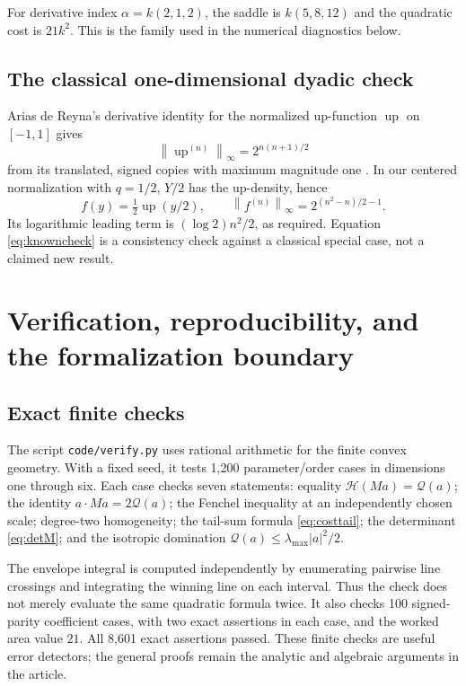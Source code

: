 \documentclass[11pt,a4paper]{article}
\numberwithin{equation}{section}
\theoremstyle{definition}
\theoremstyle{remark}\newtheorem{remark}[theorem]{Remark}
\newcommand{\He}{\mathcal H}
\newcommand{\Qf}{\mathcal Q}
\newcommand{\norm}[1]{\left\lVert #1\right\rVert}
\begin{document}
For derivative index $\alpha=k(2,1,2)$, the saddle is
$k(5,8,12)$ and the quadratic cost is $21k^2$. This is the family used in
the numerical diagnostics below.

\subsection{The classical one-dimensional dyadic check}

Arias de Reyna's derivative identity for the normalized up-function
$\operatorname{up}$ on $[-1,1]$ gives
\begin{equation}
 \norm{\operatorname{up}^{(n)}}_\infty=2^{n(n+1)/2}
 \label{eq:upnorm}
\end{equation}
from its translated, signed copies with maximum magnitude one
\cite[Theorem 4]{Arias}. In our centered normalization with $q=1/2$,
$Y/2$ has the up-density, hence
\begin{equation}
 f(y)=\tfrac12\operatorname{up}(y/2),\qquad
 \norm{f^{(n)}}_\infty=2^{(n^2-n)/2-1}.
 \label{eq:knowncheck}
\end{equation}
Its logarithmic leading term is $(\log2)n^2/2$, as required.
Equation \eqref{eq:knowncheck} is a consistency check against a classical
special case, not a claimed new result.

\section{Verification, reproducibility, and the formalization boundary}
\label{sec:verification}

\subsection{Exact finite checks}

The script \texttt{code/verify.py} uses rational arithmetic for the finite
convex geometry. With a fixed seed, it tests 1,200 parameter/order cases in
dimensions one through six. Each case checks seven statements: equality
$\He(Ma)=\Qf(a)$; the identity $a\cdot Ma=2\Qf(a)$; the Fenchel inequality
at an independently chosen scale; degree-two homogeneity; the tail-sum
formula \eqref{eq:costtail}; the determinant \eqref{eq:detM}; and the
isotropic domination $\Qf(a)\le\lambda_{\max}|a|^2/2$.

The envelope integral is computed independently by enumerating pairwise line
crossings and integrating the winning line on each interval. Thus the check
does not merely evaluate the same quadratic formula twice. It also checks
100 signed-parity coefficient cases, with two exact assertions in each case,
and the worked area value $21$. All 8,601 exact assertions passed.
These finite checks are useful error detectors; the general proofs remain
the analytic and algebraic arguments in the article.
\end{document}
